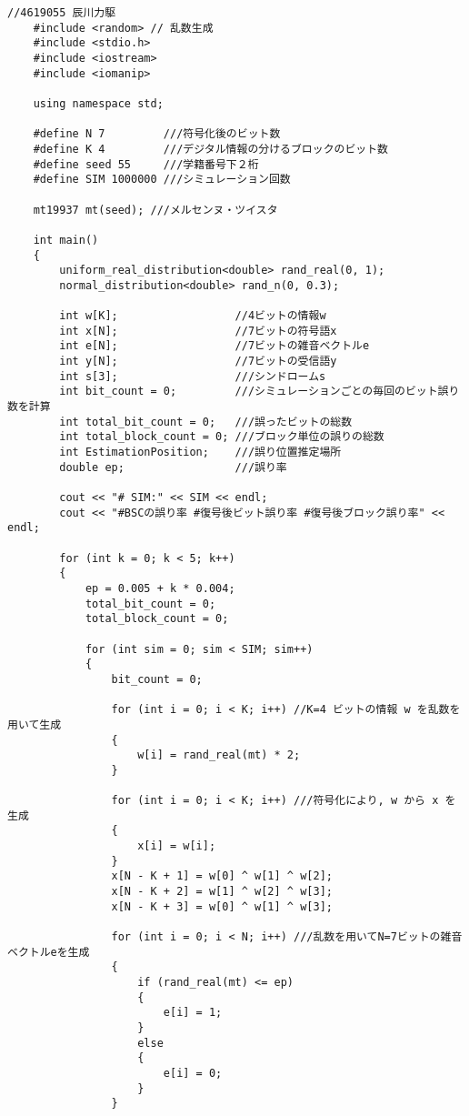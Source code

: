 \documentclass[12pt]{jarticle}
\begin{document}
\begin{lstlisting}[style = lstcpp,caption=kadai3\_3.cpp]
    //4619055 辰川力駆
    #include <random> // 乱数生成
    #include <stdio.h>
    #include <iostream>
    #include <iomanip>
    
    using namespace std;
    
    #define N 7         ///符号化後のビット数
    #define K 4         ///デジタル情報の分けるブロックのビット数
    #define seed 55     ///学籍番号下２桁
    #define SIM 1000000 ///シミュレーション回数
    
    mt19937 mt(seed); ///メルセンヌ・ツイスタ
    
    int main()
    {
        uniform_real_distribution<double> rand_real(0, 1);
        normal_distribution<double> rand_n(0, 0.3);
    
        int w[K];                  //4ビットの情報w
        int x[N];                  //7ビットの符号語x
        int e[N];                  //7ビットの雑音ベクトルe
        int y[N];                  //7ビットの受信語y
        int s[3];                  ///シンドロームs
        int bit_count = 0;         ///シミュレーションごとの毎回のビット誤り数を計算
        int total_bit_count = 0;   ///誤ったビットの総数
        int total_block_count = 0; ///ブロック単位の誤りの総数
        int EstimationPosition;    ///誤り位置推定場所
        double ep;                 ///誤り率
    
        cout << "# SIM:" << SIM << endl;
        cout << "#BSCの誤り率 #復号後ビット誤り率 #復号後ブロック誤り率" << endl;
    
        for (int k = 0; k < 5; k++)
        {
            ep = 0.005 + k * 0.004;
            total_bit_count = 0;
            total_block_count = 0;
    
            for (int sim = 0; sim < SIM; sim++)
            {
                bit_count = 0;
    
                for (int i = 0; i < K; i++) //K=4 ビットの情報 w を乱数を用いて生成
                {
                    w[i] = rand_real(mt) * 2;
                }
    
                for (int i = 0; i < K; i++) ///符号化により, w から x を生成
                {
                    x[i] = w[i];
                }
                x[N - K + 1] = w[0] ^ w[1] ^ w[2];
                x[N - K + 2] = w[1] ^ w[2] ^ w[3];
                x[N - K + 3] = w[0] ^ w[1] ^ w[3];
    
                for (int i = 0; i < N; i++) ///乱数を用いてN=7ビットの雑音ベクトルeを生成
                {
                    if (rand_real(mt) <= ep)
                    {
                        e[i] = 1;
                    }
                    else
                    {
                        e[i] = 0;
                    }
                }
    

\end{lstlisting}
\end{document}

